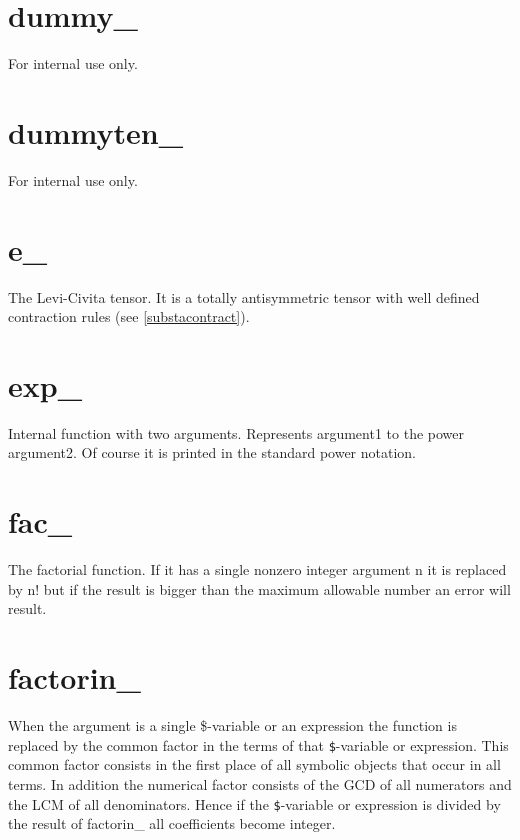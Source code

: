 \section{dummy\_}
\label{fundummy}
\noindent For internal use only.

\section{dummyten\_}
\label{fundummyten}
\noindent For internal use only.

\section{e\_}
\label{fune}
\noindent The Levi-Civita 
tensor. It is a totally 
antisymmetric tensor with well defined contraction 
rules (see \ref{substacontract}).

\section{exp\_}
\label{funexp}
\noindent Internal function with two arguments. Represents 
argument1 to the power argument2. Of course it is printed in the standard 
power notation.

\section{fac\_}
\label{funfac}
\noindent The factorial function. If it has a single nonzero 
integer argument n it is replaced by n! but if the result is bigger than 
the maximum allowable number an error will result.
 
\section{factorin\_}
\label{funfactorin}
\noindent When the argument is a single \$-variable or 
an expression the function is replaced by the common 
factor in the terms of that \verb:$:-variable or expression. This common 
factor consists in the first place of all symbolic objects that occur in 
all terms. In addition the numerical factor consists of the GCD 
of all numerators and the LCM of all denominators. Hence if the 
\verb:$:-variable or expression is divided by the result of factorin\_ all 
coefficients become integer.

